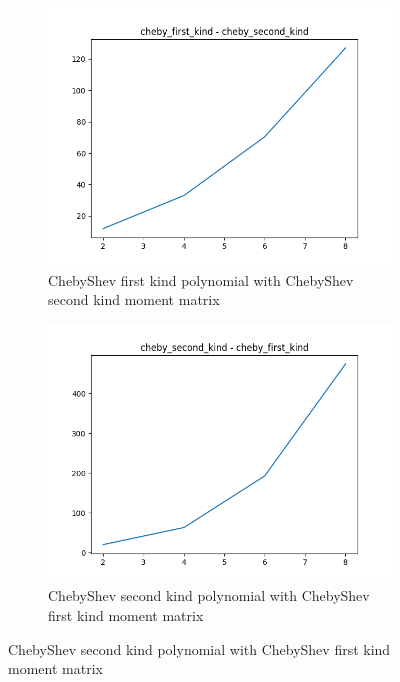 \documentclass[12pt]{amsart}
\numberwithin{equation}{section}
\theoremstyle{definition}
\numberwithin{thm}{section}
\begin{document}
 \begin{figure}[h]
     \centering
     \begin{subfigure}[b]{0.475\textwidth}
         \centering
         \includegraphics[width=\textwidth]{imgs_biv/cheby_first_kind_cheby_second_kind.png}
         \caption[ChebyShev First Kind polynomial with monomial moment matrix]%
         {\small ChebyShev first kind polynomial with ChebyShev second kind moment matrix}%

     \end{subfigure}
     \hfill
     \begin{subfigure}[b]{0.475\textwidth}  
         \centering 
         \includegraphics[width=\textwidth]{imgs_biv/cheby_second_kind_cheby_first_kind.png}
         \caption[ChebyShev second kind polynomial with ChebyShev first kind moment matrix]%
         {\small ChebyShev second kind polynomial with ChebyShev first kind moment matrix}%
 

\end{subfigure}
\end{figure}
\end{document}
